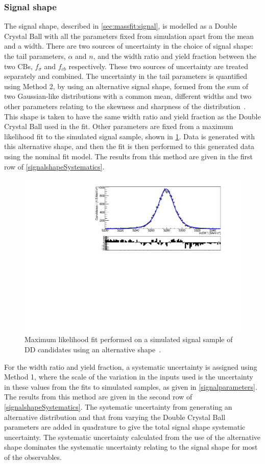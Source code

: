 \subsubsection{Signal shape}
\label{sec:systematics:signal}

The signal shape, described in \sect\ref{sec:massfit:signal}, is modelled as a Double Crystal Ball with all the parameters fixed from simulation apart from the mean and a width. There are two sources of uncertainty in the choice of signal shape: the tail parameters, $\alpha$ and $n$, and the width ratio and yield fraction between the two CBs, $f_{\sigma}$ and $f_{cb}$ respectively. These two sources of uncertainty are treated separately and combined. The uncertainty in the tail parameters is quantified using Method 2, by using an alternative signal shape, formed from the sum of two Gaussian-like distributions with a common mean, different widths and two other parameters relating to the skewness and sharpness of the distribution~\cite{doublejohnson}. This shape is taken to have the same width ratio and yield fraction as the Double Crystal Ball used in the \CP fit. Other parameters are fixed from a maximum likelihood fit to the simulated signal sample, shown in \fig\ref{signalshapesys}. Data is generated with this alternative shape, and then the \CP fit is then performed to this generated data using the nominal fit model. The results from this method are given in the first row of \tab\ref{signalshapeSystematics}.

\begin{figure}[h]
\centering
\includegraphics[width=0.7\linewidth]{figures/fitComponents/signalShape_DD_KPi_Johnson.pdf}
\caption{Maximum likelihood fit performed on a simulated signal sample of DD candidates using an alternative shape~\cite{doublejohnson}.}
\label{signalshapesys}
\end{figure}

For the width ratio and yield fraction, a systematic uncertainty is assigned using Method 1, where the scale of the variation in the inputs used is the uncertainty in these values from the fits to simulated samples, as given in \tab\ref{signalparameters}. The results from this method are given in the second row of \tab\ref{signalshapeSystematics}. The systematic uncertainty from generating an alternative distribution and that from varying the Double Crystal Ball parameters are added in quadrature to give the total signal shape systematic uncertainty. The systematic uncertainty calculated from the use of the alternative shape dominates the systematic uncertainty relating to the signal shape for most of the \CP observables.

